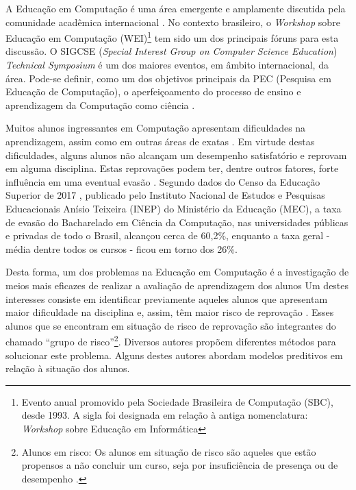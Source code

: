 A Educação em Computação é uma área emergente e amplamente discutida pela comunidade acadêmica internacional \cite{fincher2005mapping}. No contexto brasileiro, o \textit{Workshop} sobre Educação em Computação (WEI)\footnote{Evento anual promovido pela Sociedade Brasileira de Computação (SBC), desde 1993. A sigla foi designada em relação à antiga nomenclatura: \textit{Workshop} sobre Educação em Informática} tem sido um dos principais fóruns para esta discussão. O SIGCSE (\textit{Special Interest Group on Computer Science Education}) \textit{Technical Symposium} é um dos maiores eventos, em âmbito internacional, da área. Pode-se definir, como um dos objetivos principais da PEC (Pesquisa em Educação de Computação), o aperfeiçoamento do processo de ensino e aprendizagem da Computação como ciência \cite{holmboe2001research}.

Muitos alunos ingressantes em Computação apresentam dificuldades na aprendizagem, assim como em outras áreas de exatas \cite{blando2015dificuldades}. Em virtude destas dificuldades, alguns alunos não alcançam um desempenho satisfatório e reprovam em alguma disciplina. Estas reprovações podem ter, dentre outros fatores, forte influência em uma eventual evasão \cite{evasaoMatheus2014}. Segundo dados do Censo da Educação Superior de 2017 \cite{Inep2017}, publicado pelo Instituto Nacional de Estudos e Pesquisas Educacionais Anísio Teixeira (INEP) do Ministério da Educação (MEC), a taxa de evasão do Bacharelado em Ciência da Computação, nas universidades públicas e privadas de todo o Brasil, alcançou cerca de 60,2\%, enquanto a taxa geral - média dentre todos os cursos - ficou em torno dos 26\%.

Desta forma, um dos problemas na Educação em Computação é a investigação de meios mais eficazes de realizar a avaliação de aprendizagem dos alunos
Um destes interesses consiste em identificar previamente aqueles alunos que apresentam maior dificuldade na disciplina e, assim, têm maior risco de reprovação \cite{martins2012assistente}. Esses alunos que se encontram em situação de risco de reprovação são integrantes do chamado ``grupo de risco''\footnote[1]{Alunos em risco: Os alunos em situação de risco são aqueles que estão propensos a não concluir um curso, seja por insuficiência de presença ou de desempenho \cite{da2014alunos}.}. Diversos autores propõem diferentes métodos para solucionar este problema. Alguns destes autores abordam modelos preditivos em relação à situação dos alunos.


